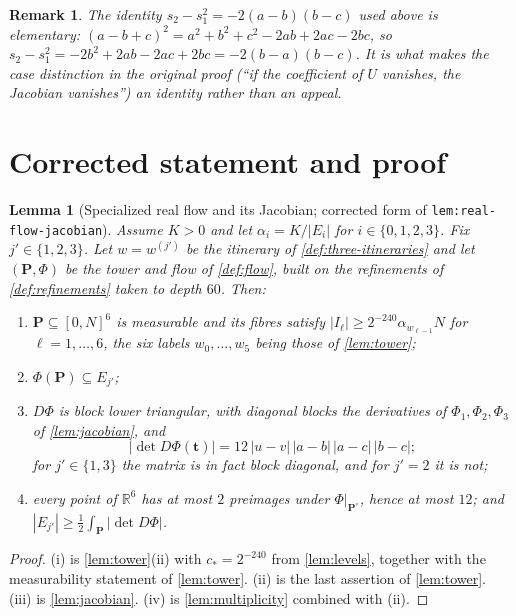 \documentclass[11pt]{article}
\newtheorem{lemma}[theorem]{Lemma}
\newtheorem{remark}[theorem]{Remark}
\newcommand{\R}{\mathbb{R}}
\newcommand{\abs}[1]{\left|#1\right|}
\newcommand{\indices}{\{1,2,3\}}
\newcommand{\Idx}{\{0,1,2,3\}}
\begin{document}
\begin{remark}
  \label{rem:verify-s2s1}
  The identity $s_2-s_1^2=-2(a-b)(b-c)$ used above is elementary:
  $(a-b+c)^2=a^2+b^2+c^2-2ab+2ac-2bc$, so
  $s_2-s_1^2=-2b^2+2ab-2ac+2bc=-2(b-a)(b-c)$.  It is what makes the
  case distinction in the original proof (``if the coefficient of $U$ vanishes,
  the Jacobian vanishes'') an identity rather than an appeal.
\end{remark}

\section{Corrected statement and proof}
\label{sec:assembly}

\begin{lemma}[Specialized real flow and its Jacobian; corrected form of \texttt{lem:real-flow-jacobian}]
  \label{lem:real-flow-jacobian-fixed}
  Assume $K>0$ and let $\alpha_i=K/\abs{E_i}$ for $i\in\Idx$.  Fix
  $j'\in\indices$.  Let $w=w^{(j')}$ be the itinerary of
  \cref{def:three-itineraries} and let
  $(\mathbf P,\Phi)$ be the tower and flow of \cref{def:flow}, built on the
  refinements of \cref{def:refinements} taken to depth $60$.  Then:
  \begin{enumerate}[label=(\roman*)]
    \item $\mathbf P\subseteq[0,N]^6$ is measurable and its fibres satisfy
      $\abs{I_\ell}\geq 2^{-240}\alpha_{w_{\ell-1}}N$ for $\ell=1,\dots,6$, the
      six labels $w_0,\dots,w_5$ being those of \cref{lem:tower};
    \item $\Phi(\mathbf P)\subseteq E_{j'}$;
    \item $D\Phi$ is block lower triangular, with diagonal blocks the derivatives
      of $\Phi_1,\Phi_2,\Phi_3$ of \cref{lem:jacobian}, and
      \[
        \abs{\det D\Phi(\mathbf t)}=12\,\abs{u-v}\,\abs{a-b}\,\abs{a-c}\,\abs{b-c};
      \]
      for $j'\in\{1,3\}$ the matrix is in fact block diagonal, and for $j'=2$ it is
      not;
    \item every point of $\R^6$ has at most $2$ preimages under
      $\Phi|_{\mathbf P^\circ}$, hence at most $12$; and
      $\abs{E_{j'}}\geq\frac12\int_{\mathbf P}\abs{\det D\Phi}$.
  \end{enumerate}
\end{lemma}

\begin{proof}
  (i) is \cref{lem:tower}(ii) with $c_\ast=2^{-240}$ from \cref{lem:levels},
  together with the measurability statement of \cref{lem:tower}.  (ii) is the last
  assertion of \cref{lem:tower}.  (iii) is \cref{lem:jacobian}.  (iv) is
  \cref{lem:multiplicity} combined with (ii).
\end{proof}
\end{document}
